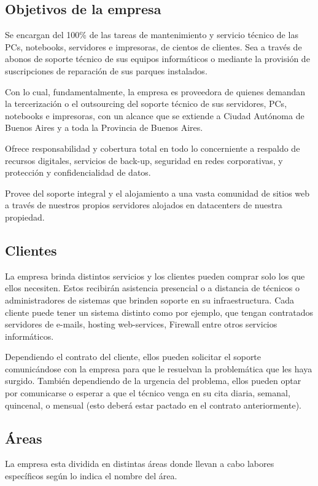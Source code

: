 \documentclass[12pt,a4paper]{article}
\begin{document}
\subsection{Objetivos de la empresa}
Se encargan del 100\% de las tareas de mantenimiento y servicio técnico de las PCs, notebooks, servidores e impresoras, de cientos de clientes. Sea a través de abonos de soporte técnico de sus equipos informáticos o mediante la provisión de suscripciones de reparación de sus parques instalados.

Con lo cual, fundamentalmente, la empresa es proveedora de quienes demandan la tercerización o el outsourcing del soporte técnico de sus servidores, PCs, notebooks e impresoras, con un alcance que se extiende a Ciudad Autónoma de Buenos Aires y a toda la Provincia de Buenos Aires.

Ofrece responsabilidad y cobertura total en todo lo concerniente a respaldo de recursos digitales, servicios de back-up, seguridad en redes corporativas, y protección y confidencialidad de datos.

Provee del soporte integral y el alojamiento a una vasta comunidad de sitios web a través de nuestros propios servidores alojados en datacenters de nuestra propiedad.

\subsection{Clientes}
La empresa brinda distintos servicios y los clientes pueden comprar solo los que ellos necesiten. Estos recibirán asistencia presencial o a distancia de técnicos o administradores de sistemas que brinden soporte en su infraestructura. Cada cliente puede tener un sistema distinto como por ejemplo, que tengan contratados servidores de e-mails, hosting web-services, Firewall entre otros servicios informáticos.

Dependiendo el contrato del cliente, ellos pueden solicitar el soporte comunicándose con la empresa para que le resuelvan la problemática que les haya surgido. También dependiendo de la urgencia del problema, ellos pueden optar por comunicarse o esperar a que el técnico venga en su cita diaria, semanal, quincenal, o mensual (esto deberá estar pactado en el contrato anteriormente).

\subsection{Áreas}
La empresa esta dividida en distintas áreas donde llevan a cabo labores específicos según lo indica el nombre del área.
\end{document}
